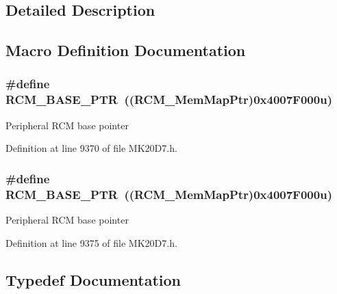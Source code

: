 \subsection{Detailed Description}


\subsection{Macro Definition Documentation}
\subsubsection[{\texorpdfstring{R\+C\+M\+\_\+\+B\+A\+S\+E\+\_\+\+P\+TR}{RCM_BASE_PTR}}]{\setlength{\rightskip}{0pt plus 5cm}\#define R\+C\+M\+\_\+\+B\+A\+S\+E\+\_\+\+P\+TR~(({\bf R\+C\+M\+\_\+\+Mem\+Map\+Ptr})0x4007\+F000u)}\hypertarget{group___r_c_m___peripheral_ga25ab3aa8d593d455ed36a52c77f88234}{}\label{group___r_c_m___peripheral_ga25ab3aa8d593d455ed36a52c77f88234}
Peripheral R\+CM base pointer 

Definition at line 9370 of file M\+K20\+D7.\+h.

\subsubsection[{\texorpdfstring{R\+C\+M\+\_\+\+B\+A\+S\+E\+\_\+\+P\+TR}{RCM_BASE_PTR}}]{\setlength{\rightskip}{0pt plus 5cm}\#define R\+C\+M\+\_\+\+B\+A\+S\+E\+\_\+\+P\+TR~(({\bf R\+C\+M\+\_\+\+Mem\+Map\+Ptr})0x4007\+F000u)}\hypertarget{group___r_c_m___peripheral_ga25ab3aa8d593d455ed36a52c77f88234}{}\label{group___r_c_m___peripheral_ga25ab3aa8d593d455ed36a52c77f88234}
Peripheral R\+CM base pointer 

Definition at line 9375 of file M\+K20\+D7.\+h.



\subsection{Typedef Documentation}
